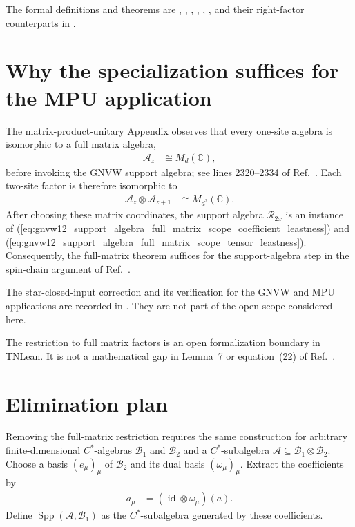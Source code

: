 \documentclass[11pt]{article}
\begin{document}
The formal definitions and theorems are
,
,
,
,
,
, and their
right-factor counterparts in
.

\section{Why the specialization suffices for the MPU application}

The matrix-product-unitary Appendix observes that every one-site algebra is
isomorphic to a full matrix algebra,
\begin{align}
    \mathcal A_z
    &\cong M_d(\mathbb C),
    \label{eq:gnvw12_support_algebra_full_matrix_scope_mpu_site_algebra}
\end{align}
before invoking the GNVW support algebra; see lines 2320--2334 of
Ref.~\cite{Cirac2017MPU}. Each two-site factor is therefore isomorphic to
\begin{align}
    \mathcal A_z\otimes\mathcal A_{z+1}
    &\cong M_{d^2}(\mathbb C).
    \label{eq:gnvw12_support_algebra_full_matrix_scope_mpu_two_site_algebra}
\end{align}
After choosing these matrix coordinates, the support algebra
$\mathcal R_{2x}$ is an instance of
(\ref{eq:gnvw12_support_algebra_full_matrix_scope_coefficient_leastness}) and
(\ref{eq:gnvw12_support_algebra_full_matrix_scope_tensor_leastness}).
Consequently, the full-matrix theorem suffices for the support-algebra step in
the spin-chain argument of Ref.~\cite{Cirac2017MPU}.

The star-closed-input correction and its verification for the GNVW and MPU
applications are recorded in
. They are not
part of the open scope considered here.

The restriction to full matrix factors is an open formalization boundary in
TNLean. It is not a mathematical gap in Lemma~7 or equation~(22) of
Ref.~\cite{Gross2012IndexTheory}.

\section{Elimination plan}

Removing the full-matrix restriction requires the same construction for
arbitrary finite-dimensional $C^*$-algebras $\mathcal B_1$ and $\mathcal B_2$
and a $C^*$-subalgebra
$\mathcal A\subseteq\mathcal B_1\otimes\mathcal B_2$. Choose a basis
$(e_\mu)_\mu$ of $\mathcal B_2$ and its dual basis $(\omega_\mu)_\mu$. Extract
the coefficients by
\begin{align}
    a_\mu
    &=(\operatorname{id}\otimes\omega_\mu)(a).
    \label{eq:gnvw12_support_algebra_full_matrix_scope_dual_coefficient}
\end{align}
Define $\operatorname{Spp}(\mathcal A,\mathcal B_1)$ as the
$C^*$-subalgebra generated by these coefficients.
\end{document}
